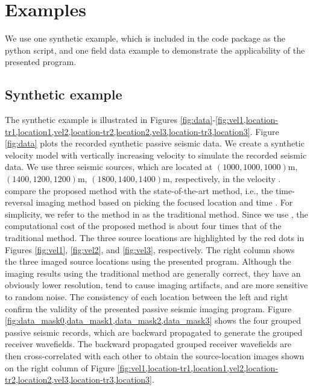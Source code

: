 \section{Examples}
We use one synthetic example, which is included in the code package as the python script, and one field data example to demonstrate the applicability of the presented program. 
\subsection{Synthetic example}
The synthetic example is illustrated in Figures \ref{fig:data}-\ref{fig:vel1,location-tr1,location1,vel2,location-tr2,location2,vel3,location-tr3,location3}. Figure \ref{fig:data} plots the recorded synthetic passive seismic data. We create a synthetic velocity model with vertically increasing velocity to simulate the recorded seismic data.  We use three seismic sources, which are located at $(1000,1000,1000)$m, $(1400,1200,1200)$m, $(1800,1400,1400)$m, respectively, in the velocity .   compare the proposed method with the state-of-the-art method, i.e., the time-reversal imaging method based on picking the focused location and time \cite[]{2005Reverse}. For simplicity, we refer to the method in \cite{2005Reverse} as the traditional method. Since we use , the computational cost of the proposed method is about four times that of the traditional method. The three source locations are highlighted by the red dots in Figures \ref{fig:vel1}, \ref{fig:vel2}, and \ref{fig:vel3}, respectively.  The right column shows the three imaged source locations using the presented program. Although the imaging results using the traditional method are generally correct, they have an obviously lower resolution, tend to cause imaging artifacts, and are more sensitive to random noise. The consistency of each location between the left and right  confirm the validity of the presented passive seismic imaging program. Figure \ref{fig:data_mask0,data_mask1,data_mask2,data_mask3} shows the four grouped passive seismic records, which are backward propagated to generate the grouped receiver wavefields. The backward propagated grouped receiver wavefields are then cross-correlated with each other to obtain the source-location images shown on the right column of Figure \ref{fig:vel1,location-tr1,location1,vel2,location-tr2,location2,vel3,location-tr3,location3}.

